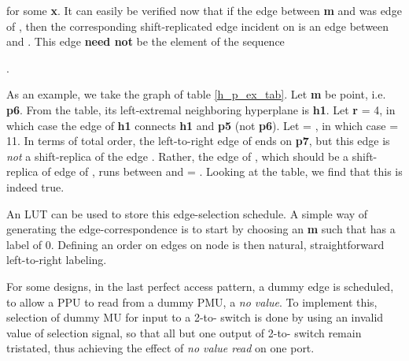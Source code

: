 \documentclass[12pt]{article}
\begin{document}
 for some \textbf{x}. It can easily be verified now that if
the edge between \textbf{m} and  was  edge of ,
then the corresponding shift-replicated edge incident on  is an edge
between  and . This edge \textbf{need not} be the 
element of the sequence      
       
.

As an example, we take the graph of table \ref{h_p_ex_tab}. Let
\textbf{m} be  point, i.e. \textbf{p6}. From the table, its
left-extremal neighboring hyperplane is \textbf{h1}. Let \textbf{r} = 4, in
which case the  edge of \textbf{h1} connects \textbf{h1} and
\textbf{p5} (not \textbf{p6}). Let  = , in which
case  = 11. In terms of total order, the 
left-to-right edge of  ends on \textbf{p7}, but this edge
is \textit{not} a shift-replica of the edge . Rather, the  edge of
, which should be a
shift-replica of  edge of , runs between
 and  =
.  Looking at the table, we find that this is indeed true.

An LUT can be used to store this
edge-selection schedule. A simple way of generating the edge-correspondence
is to start by choosing an \textbf{m} such that  has a label of 0.
Defining an order on edges on  node is then natural,
straightforward left-to-right labeling.
 
For some designs, in the last perfect access pattern, a dummy edge
is scheduled, to allow a PPU to read from a dummy
PMU, a \textit{no value}.
To implement this, selection of dummy MU for input to a
2-to- switch is done by using an invalid value of selection
signal, so that all but one output of 2-to- switch remain
tristated, thus achieving the effect of \textit{no value read} on one
port.
\end{document}

